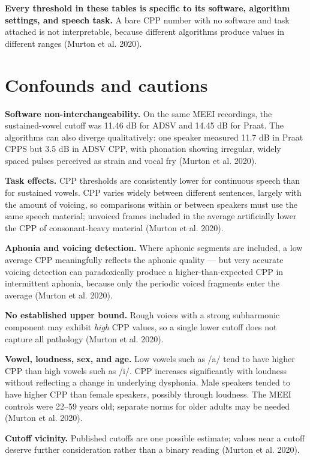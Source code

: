 \documentclass[
  english,
  letterpaper,
]{scrbook}
\begin{document}
\textbf{Every threshold in these tables is specific to its software,
algorithm settings, and speech task.} A bare CPP number with no software
and task attached is not interpretable, because different algorithms
produce values in different ranges (Murton et al. 2020).

\section{Confounds and cautions}\label{confounds-and-cautions}

\textbf{Software non-interchangeability.} On the same MEEI recordings,
the sustained-vowel cutoff was 11.46 dB for ADSV and 14.45 dB for Praat.
The algorithms can also diverge qualitatively: one speaker measured 11.7
dB in Praat CPPS but 3.5 dB in ADSV CPP, with phonation showing
irregular, widely spaced pulses perceived as strain and vocal fry
(Murton et al. 2020).

\textbf{Task effects.} CPP thresholds are consistently lower for
continuous speech than for sustained vowels. CPP varies widely between
different sentences, largely with the amount of voicing, so comparisons
within or between speakers must use the same speech material; unvoiced
frames included in the average artificially lower the CPP of
consonant-heavy material (Murton et al. 2020).

\textbf{Aphonia and voicing detection.} Where aphonic segments are
included, a low average CPP meaningfully reflects the aphonic quality
--- but very accurate voicing detection can paradoxically produce a
higher-than-expected CPP in intermittent aphonia, because only the
periodic voiced fragments enter the average (Murton et al. 2020).

\textbf{No established upper bound.} Rough voices with a strong
subharmonic component may exhibit \emph{high} CPP values, so a single
lower cutoff does not capture all pathology (Murton et al. 2020).

\textbf{Vowel, loudness, sex, and age.} Low vowels such as /a/ tend to
have higher CPP than high vowels such as /i/. CPP increases
significantly with loudness without reflecting a change in underlying
dysphonia. Male speakers tended to have higher CPP than female speakers,
possibly through loudness. The MEEI controls were 22--59 years old;
separate norms for older adults may be needed (Murton et al. 2020).

\textbf{Cutoff vicinity.} Published cutoffs are one possible estimate;
values near a cutoff deserve further consideration rather than a binary
reading (Murton et al. 2020).
\end{document}
